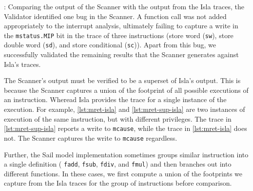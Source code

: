 : Comparing the output of the Scanner with the output from the Isla traces, the Validator identified one bug in the Scanner. 
A function call was not added appropriately to the interrupt analysis, ultimately failing to capture a write in the \texttt{mstatus.MIP} bit in the trace of three instructions (store word (\texttt{sw}), store double word (\texttt{sd}), and store conditional (\texttt{sc})). 
Apart from this bug, we successfully validated the remaining results that the Scanner generates against Isla's traces. 

The Scanner's output must be verified to be a superset of Isla's output. 
This is because the Scanner captures a union of the footprint of all possible executions of an instruction. 
Wheread Isla provides the trace for a single instance of the execution.
For example, \autoref{lst:mret-isla} and \autoref{lst:mret-sup-isla} are two instances of execution of the same instruction, but with different privileges. 
The trace in \autoref{lst:mret-sup-isla} reports a write to \texttt{mcause}, while the trace in \autoref{lst:mret-isla} does not. 
The Scanner captures the write to \texttt{mcause} regardless.

Further, the Sail model implementation sometimes groups similar instruction into a single definition (\eg{} \texttt{fadd}, \texttt{fsub}, \texttt{fdiv}, and \texttt{fmul}) and then branches out into different functions. 
In these cases, we first compute a union of the footprints we capture from the Isla traces for the group of instructions before comparison. 







